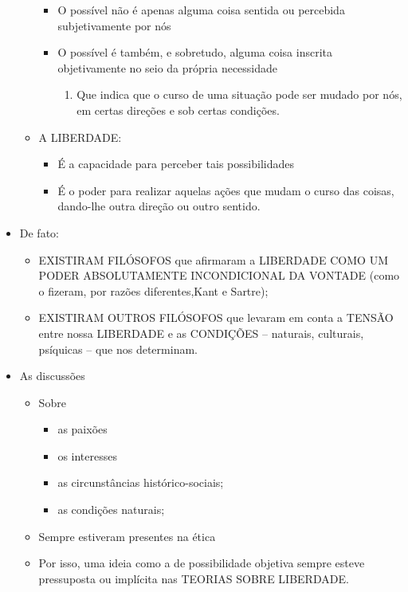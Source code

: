\documentclass[
]{book}
\providecommand{\tightlist}{%
  \setlength{\itemsep}{0pt}\setlength{\parskip}{0pt}}
\begin{document}
\begin{itemize}
\begin{itemize}
    \begin{itemize}
    \tightlist
    \item
      O possível não é apenas alguma coisa sentida ou percebida
      subjetivamente por nós
    \item
      O possível é também, e sobretudo, alguma coisa inscrita
      objetivamente no seio da própria necessidade

      \begin{enumerate}
      \def\labelenumi{\alph{enumi}.}
      \tightlist
      \item
        Que indica que o curso de uma situação pode ser mudado por nós,
        em certas direções e sob certas condições.
      \end{enumerate}
    \end{itemize}
  \item
    A LIBERDADE:

    \begin{itemize}
    \tightlist
    \item
      É a capacidade para perceber tais possibilidades
    \item
      É o poder para realizar aquelas ações que mudam o curso das
      coisas, dando-lhe outra direção ou outro sentido.
    \end{itemize}
  \end{itemize}
\item
  De fato:

  \begin{itemize}
  \tightlist
  \item
    EXISTIRAM FILÓSOFOS que afirmaram a LIBERDADE COMO UM PODER
    ABSOLUTAMENTE INCONDICIONAL DA VONTADE (como o fizeram, por razões
    diferentes,Kant e Sartre);
  \item
    EXISTIRAM OUTROS FILÓSOFOS que levaram em conta a TENSÃO entre nossa
    LIBERDADE e as CONDIÇÕES -- naturais, culturais, psíquicas -- que
    nos determinam.
  \end{itemize}
\item
  As discussões

  \begin{itemize}
  \tightlist
  \item
    Sobre

    \begin{itemize}
    \tightlist
    \item
      as paixões
    \item
      os interesses
    \item
      as circunstâncias histórico-sociais;
    \item
      as condições naturais;
    \end{itemize}
  \item
    Sempre estiveram presentes na ética
  \item
    Por isso, uma ideia como a de possibilidade objetiva sempre esteve
    pressuposta ou implícita nas TEORIAS SOBRE LIBERDADE.
  \end{itemize}
\end{itemize}
\end{document}
